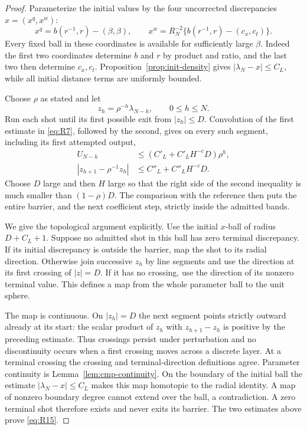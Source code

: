 \begin{proof}
Parameterize the initial values by the four uncorrected discrepancies
$x=(x^q,x^w)$:
\[
 x^q=b(r^{-1},r)-(\beta,\beta),\qquad
 x^w=R_N^{-2}\{b(r^{-1},r)-(c_x,c_t)\}.
\]
Every fixed ball in these coordinates is available for sufficiently
large $\beta$.  Indeed the first two coordinates determine $b$ and $r$
by product and ratio, and the last two then determine $c_x,c_t$.
Proposition~\ref{prop:init-density} gives
$|\lambda_N-x|\le C_L$, while all initial distance terms are uniformly
bounded.

Choose $\rho$ as stated and let
\[
 z_h=\rho^{-h}\lambda_{N-h},\qquad 0\le h\le N.
\]
Run each shot until its first possible exit from $|z_h|\le D$.
Convolution of the first estimate in \eqref{eq:R7}, followed by the
second, gives on every such segment, including its first attempted
output,
\begin{align*}
 U_{N-h}&\le (C'_L+C'_LH^{-c}D)\rho^h,\\
 |z_{h+1}-\rho^{-1}z_h|&\le C''_L+C''_LH^{-c}D.
\end{align*}
Choose $D$ large and then $H$ large so that the right side of the second
inequality is much smaller than $(1-\rho)D$.  The comparison with the
reference then puts the entire barrier, and the next coefficient step,
strictly inside the admitted bands.

We give the topological argument explicitly.  Use the initial $x$-ball
of radius $D+C_L+1$.  Suppose no admitted shot in this ball has zero
terminal discrepancy.  If its initial discrepancy is outside the
barrier, map the shot to its radial direction.  Otherwise join successive
$z_h$ by line segments and use the direction at its first crossing of
$|z|=D$.  If it has no crossing, use the direction of its nonzero
terminal value.  This defines a map from the whole parameter ball to
the unit sphere.

The map is continuous.  On $|z_h|=D$ the next segment points strictly
outward already at its start: the scalar product of $z_h$ with
$z_{h+1}-z_h$ is positive by the preceding estimate.  Thus crossings
persist under perturbation and no discontinuity occurs when a first
crossing moves across a discrete layer.  At a terminal crossing the
crossing and terminal-direction definitions agree.  Parameter
continuity is Lemma~\ref{lem:cmp-continuity}.  On the boundary of the
initial ball the estimate $|\lambda_N-x|\le C_L$ makes this map
homotopic to the radial identity.  A map of nonzero boundary degree
cannot extend over the ball, a contradiction.  A zero terminal
shot therefore exists and never exits its barrier.  The two estimates
above prove \eqref{eq:R15}.
\end{proof}

